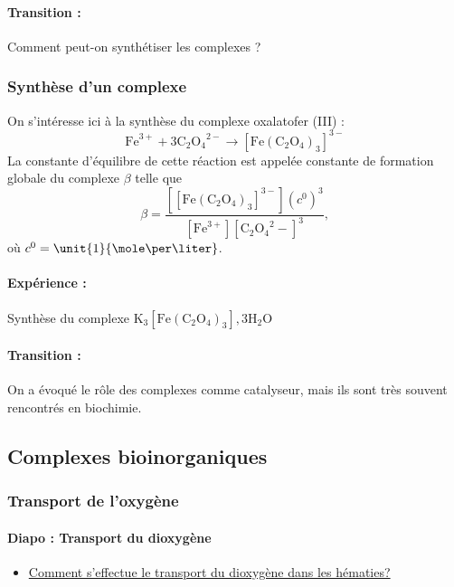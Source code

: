 \paragraph{Transition :} Comment peut-on synthétiser les complexes ?

\subsubsection{Synthèse d'un complexe}

On s'intéresse ici à la synthèse du complexe oxalatofer (III) :
\begin{equation*}
\mathrm{Fe}^{3+} + 3 \mathrm{C_2O_4}^{2-} \rightarrow \mathrm{[Fe(C_2O_4)_3]}^{3-}
\end{equation*}
La constante d'équilibre de cette réaction est appelée constante de formation globale du complexe $\beta$ telle que
\begin{equation*}
\beta = \frac{[\mathrm{[Fe(C_2O_4)_3]}^{3-}](c^0)^3}{[\mathrm{Fe}^{3+}][\mathrm{C_2O_4}^2-]^3},
\end{equation*}
où $c^0 = \unit{1}{\mole\per\liter}$.

\paragraph{Expérience :} Synthèse du complexe $\mathrm{K_3[Fe(C_2O_4)_3],3H_2O}$

\paragraph{Transition :} On a évoqué le rôle des complexes comme catalyseur, mais ils sont très souvent rencontrés en biochimie.

\subsection{Complexes bioinorganiques}

\subsubsection{Transport de l'oxygène}

\paragraph{Diapo : Transport du dioxygène}

\begin{itemize}
\item \href{https://www.rts.ch/decouverte/sante-et-medecine/corps-humain/9852272-comment-s-effectue-le-transport-du-dioxygene-dans-les-hematies-.html}{Comment s'effectue le transport du dioxygène dans les hématies?}
\end{itemize}

